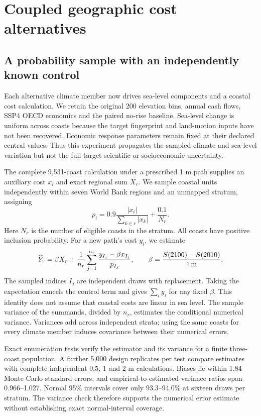 \section{Coupled geographic cost alternatives}
\subsection{A probability sample with an independently known control}
Each alternative climate member now drives sea-level components and a coastal
cost calculation. We retain the original 200 elevation bins, annual cash flows,
SSP4 OECD economics and the paired no-rise baseline. Sea-level change is uniform
across coasts because the target fingerprint and land-motion inputs have not
been recovered. Economic response parameters remain fixed at their declared
central values. Thus this experiment propagates the sampled climate and sea-level
variation but not the full target scientific or socioeconomic uncertainty.

The complete 9,531-coast calculation under a prescribed 1 m path supplies an
auxiliary cost $x_i$ and exact regional sum $X_r$. We sample coastal units
independently within seven World Bank regions and an unmapped stratum, assigning
\begin{equation}
 p_i=0.9\frac{|x_i|}{\sum_{k\in r}|x_k|}+\frac{0.1}{N_r}.
\end{equation}
Here $N_r$ is the number of eligible coasts in the stratum. All coasts have
positive inclusion probability. For a new path's cost $y_i$, we estimate
\begin{equation}
 \widehat Y_r=\beta X_r+\frac{1}{n_r}\sum_{j=1}^{n_r}
 \frac{y_{I_j}-\beta x_{I_j}}{p_{I_j}},
 \qquad \beta=\frac{S(2100)-S(2010)}{1\,{\rm m}}.
\end{equation}
The sampled indices $I_j$ are independent draws with replacement. Taking the
expectation cancels the control term and gives $\sum_i y_i$ for any fixed
$\beta$. This identity does not assume that coastal costs are linear in sea
level. The sample variance of the summands, divided by $n_r$, estimates the
conditional numerical variance. Variances add across independent strata;
using the same coasts for every climate member induces covariance between
their numerical errors.

Exact enumeration tests verify the estimator and its variance for a finite
three-coast population. A further 5,000 design replicates per test compare
estimates with complete independent 0.5, 1 and 2 m calculations. Biases lie
within 1.84 Monte Carlo standard errors, and empirical-to-estimated variance
ratios span 0.966--1.027. Normal 95\% intervals cover only 93.3--94.0\% at
sixteen draws per stratum. The variance check therefore supports the numerical
error estimate without establishing exact normal-interval coverage.

